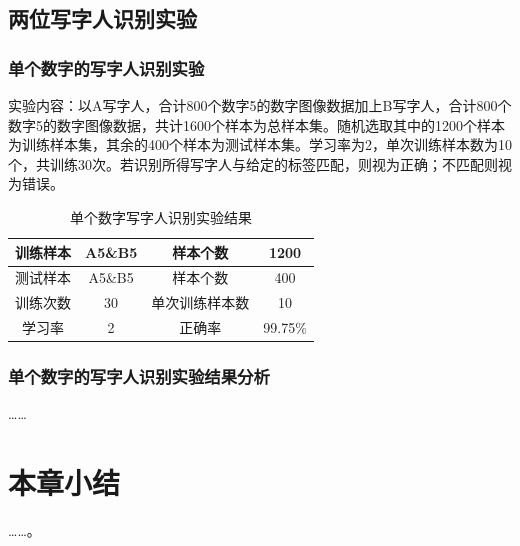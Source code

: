 \subsection{两位写字人识别实验}
\subsubsection{单个数字的写字人识别实验}
实验内容：以A写字人，合计800个数字5的数字图像数据加上B写字人，合计800个数字5的数字图像数据，共计1600个样本为总样本集。随机选取其中的1200个样本为训练样本集，其余的400个样本为测试样本集。学习率为2，单次训练样本数为10个，共训练30次。若识别所得写字人与给定的标签匹配，则视为正确；不匹配则视为错误。
\begin{table}[]
    \centering
    \caption{单个数字写字人识别实验结果}
    \label{tab:3}
    \begin{tabular}{@{}cccc@{}}
        \toprule
        训练样本 & A5\&B5 & 样本个数    & 1200    \\ \midrule
        测试样本 & A5\&B5 & 样本个数    & 400     \\
        训练次数 & 30     & 单次训练样本数 & 10      \\
        学习率  & 2      & 正确率     & 99.75\% \\ \bottomrule
    \end{tabular}
\end{table}
\subsubsection{单个数字的写字人识别实验结果分析}

……
\section{本章小结}

……。
